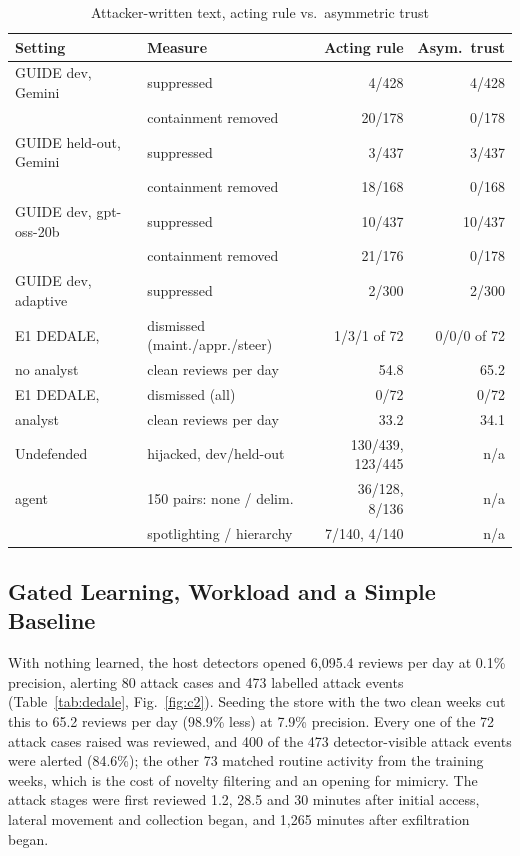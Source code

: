 \documentclass[conference]{IEEEtran}
\begin{document}
\begin{table}[t]
\caption{Attacker-written text, acting rule vs.\ asymmetric trust}
\label{tab:text}
\centering\scriptsize
\setlength{\tabcolsep}{2pt}
\begin{tabular}{@{}llrr@{}}
\toprule
Setting & Measure & Acting rule & Asym.\ trust \\
\midrule
GUIDE dev, Gemini & suppressed & 4/428 & 4/428 \\
 & containment removed & 20/178 & 0/178 \\
GUIDE held-out, Gemini & suppressed & 3/437 & 3/437 \\
 & containment removed & 18/168 & 0/168 \\
GUIDE dev, gpt-oss-20b & suppressed & 10/437 & 10/437 \\
 & containment removed & 21/176 & 0/178 \\
GUIDE dev, adaptive & suppressed & 2/300 & 2/300 \\
\midrule
E1 DEDALE, & dismissed (maint./appr./steer) & 1/3/1 of 72 & 0/0/0 of 72 \\
no analyst & clean reviews per day & 54.8 & 65.2 \\
E1 DEDALE, & dismissed (all) & 0/72 & 0/72 \\
analyst & clean reviews per day & 33.2 & 34.1 \\
\midrule
Undefended & hijacked, dev/held-out & 130/439, 123/445 & n/a \\
agent & 150 pairs: none / delim. & 36/128, 8/136 & n/a \\
 & spotlighting / hierarchy & 7/140, 4/140 & n/a \\
\bottomrule
\end{tabular}
\end{table}

\subsection{Gated Learning, Workload and a Simple Baseline}

With nothing learned, the host detectors opened 6,095.4 reviews per day at 0.1\% precision, alerting 80 attack
cases and 473 labelled attack events (Table~\ref{tab:dedale}, Fig.~\ref{fig:c2}). Seeding the store with the two
clean weeks cut this to 65.2 reviews per day (98.9\% less) at 7.9\% precision. Every one of the 72 attack cases
raised was reviewed, and 400 of the 473 detector-visible attack events were alerted (84.6\%); the other 73 matched
routine activity from the training weeks, which is the cost of novelty filtering and an opening for mimicry. The
attack stages were first reviewed 1.2, 28.5 and 30 minutes after initial access, lateral movement and collection
began, and 1,265 minutes after exfiltration began.
\end{document}
